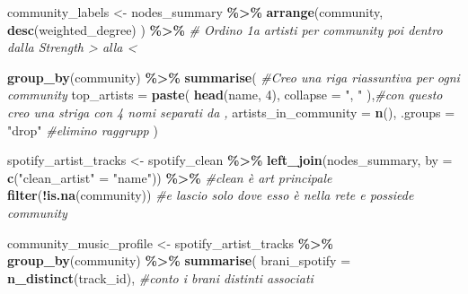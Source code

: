 \documentclass[
]{article}
\newenvironment{Shaded}{\begin{snugshade}}{\end{snugshade}}
\newcommand{\AttributeTok}[1]{\textcolor[rgb]{0.13,0.29,0.53}{#1}}
\newcommand{\CommentTok}[1]{\textcolor[rgb]{0.56,0.35,0.01}{\textit{#1}}}
\newcommand{\DecValTok}[1]{\textcolor[rgb]{0.00,0.00,0.81}{#1}}
\newcommand{\FunctionTok}[1]{\textcolor[rgb]{0.13,0.29,0.53}{\textbf{#1}}}
\newcommand{\NormalTok}[1]{#1}
\newcommand{\OtherTok}[1]{\textcolor[rgb]{0.56,0.35,0.01}{#1}}
\newcommand{\SpecialCharTok}[1]{\textcolor[rgb]{0.81,0.36,0.00}{\textbf{#1}}}
\newcommand{\StringTok}[1]{\textcolor[rgb]{0.31,0.60,0.02}{#1}}
\begin{document}
\begin{Shaded}
\begin{Highlighting}[]
\NormalTok{community\_labels }\OtherTok{\textless{}{-}}\NormalTok{ nodes\_summary }\SpecialCharTok{\%\textgreater{}\%}
  \FunctionTok{arrange}\NormalTok{(community,}
          \FunctionTok{desc}\NormalTok{(weighted\_degree)}
\NormalTok{          ) }\SpecialCharTok{\%\textgreater{}\%}
  \CommentTok{\# Ordino 1a artisti per community poi dentro dalla Strength \textgreater{} alla \textless{}}
  
  \FunctionTok{group\_by}\NormalTok{(community) }\SpecialCharTok{\%\textgreater{}\%}
  \FunctionTok{summarise}\NormalTok{( }\CommentTok{\#Creo una riga riassuntiva per ogni community}
    \AttributeTok{top\_artists =} \FunctionTok{paste}\NormalTok{(}
      \FunctionTok{head}\NormalTok{(name, }\DecValTok{4}\NormalTok{),}
      \AttributeTok{collapse =} \StringTok{", "}
\NormalTok{      ),}\CommentTok{\#con questo creo una striga con 4 nomi separati da ,}
    \AttributeTok{artists\_in\_community =} \FunctionTok{n}\NormalTok{(),}
    \AttributeTok{.groups =} \StringTok{"drop"} \CommentTok{\#elimino raggrupp}
\NormalTok{  )}

\NormalTok{spotify\_artist\_tracks }\OtherTok{\textless{}{-}}\NormalTok{ spotify\_clean }\SpecialCharTok{\%\textgreater{}\%}
  \FunctionTok{left\_join}\NormalTok{(nodes\_summary, }\AttributeTok{by =} \FunctionTok{c}\NormalTok{(}\StringTok{"clean\_artist"} \OtherTok{=} \StringTok{"name"}\NormalTok{)) }\SpecialCharTok{\%\textgreater{}\%} \CommentTok{\#clean è art principale}
  \FunctionTok{filter}\NormalTok{(}\SpecialCharTok{!}\FunctionTok{is.na}\NormalTok{(community)) }\CommentTok{\#e lascio solo dove esso è nella rete e possiede community}

\NormalTok{community\_music\_profile }\OtherTok{\textless{}{-}}\NormalTok{ spotify\_artist\_tracks }\SpecialCharTok{\%\textgreater{}\%}
  \FunctionTok{group\_by}\NormalTok{(community) }\SpecialCharTok{\%\textgreater{}\%}
  \FunctionTok{summarise}\NormalTok{(}
    \AttributeTok{brani\_spotify =} \FunctionTok{n\_distinct}\NormalTok{(track\_id), }\CommentTok{\#conto i brani distinti associati}
    

\end{Highlighting}
\end{Shaded}
\end{document}
